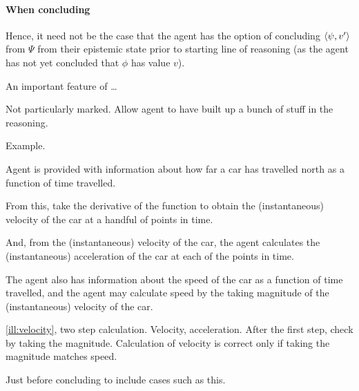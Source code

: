 \paragraph{When concluding}

\begin{note}
  Hence, it need not be the case that the agent has the option of concluding \(\langle \psi, v' \rangle\) from \(\Psi\) from their epistemic state prior to starting line of reasoning (as the agent has not yet concluded that \(\phi\) has value \(v\)).
\end{note}

\begin{note}
  An important feature of \qzS{} \dots

  Not particularly marked.
  Allow agent to have built up a bunch of stuff in the reasoning.

  Example.

  \begin{scenario}[Velocity]
    \label{ill:velocity}
    Agent is provided with information about how far a car has travelled north as a function of time travelled.

    From this, take the derivative of the function to obtain the (instantaneous) velocity of the car at a handful of points in time.

    And, from the (instantaneous) velocity of the car, the agent calculates the (instantaneous) acceleration of the car at each of the points in time.

    The agent also has information about the speed of the car as a function of time travelled, and the agent may calculate speed by the taking magnitude of the (instantaneous) velocity of the car.
  \end{scenario}

  \autoref{ill:velocity}, two step calculation.
  Velocity, acceleration.
  After the first step, check by taking the magnitude.
  Calculation of velocity is correct only if taking the magnitude matches speed.

  Just before concluding to include cases such as this.
\end{note}


